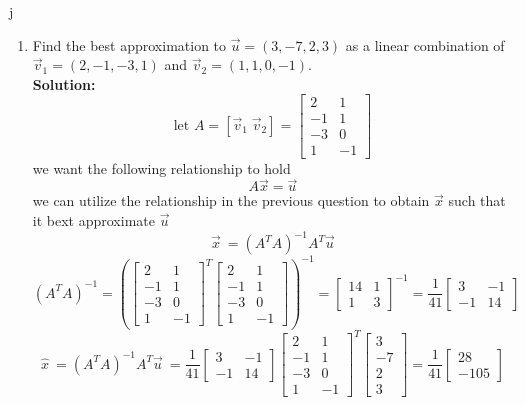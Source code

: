 j\documentclass[12pt]{article}
\begin{document}
\begin{enumerate}
\item Find the best approximation to $\vec{u}=(3,-7,2,3)$ as a linear combination of $\vec v_1=(2,-1,-3,1)$ and $\vec v_2=(1,1,0,-1)$.
\\
\textbf{Solution:}
\\
\[
\text{let }A = [\vec{v}_1 \; \vec{v}_2] = 
\begin{bmatrix}
    2&1\\
    -1&1\\
    -3&0\\
    1&-1
\end{bmatrix}
\]
we want the following relationship to hold
\[
A \Vec{x}=\Vec{u}
\]
we can utilize the relationship in the previous question to obtain $\vec x$ such that it bext approximate $\vec u$
\[
\vec x\ = (A^TA)^{-1}A^T\Vec{u}
\]
\[
(A^TA)^{-1} = 
\left(
\begin{bmatrix}
    2&1\\
    -1&1\\
    -3&0\\
    1&-1
\end{bmatrix}^T
\begin{bmatrix}
    2&1\\
    -1&1\\
    -3&0\\
    1&-1
\end{bmatrix}
\right)^{-1}
=
\begin{bmatrix}
    14&1\\
    1&3
\end{bmatrix}^{-1}
=
\frac{1}{41}
\begin{bmatrix}
    3&-1\\
    -1&14
\end{bmatrix}
\]
\[
\hat x\ = (A^TA)^{-1}A^T\vec u\ = 
\frac{1}{41}
\begin{bmatrix}
    3&-1\\
    -1&14
\end{bmatrix}
\begin{bmatrix}
    2&1\\
    -1&1\\
    -3&0\\
    1&-1
\end{bmatrix}^T
\begin{bmatrix}
    3\\-7\\2\\3
\end{bmatrix}
=
\frac{1}{41}
\begin{bmatrix}
    28\\-105

\end{bmatrix}\]
\end{enumerate}
\end{document}
